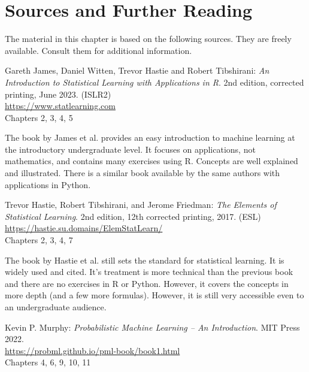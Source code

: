 %
%

\section*{Sources and Further Reading}

The material in this chapter is based on the following sources. They are freely available. Consult them for additional information.

\begin{tcolorbox}[colback=alert]
Gareth James, Daniel Witten, Trevor Hastie and Robert Tibshirani: \emph{An Introduction to Statistical Learning with Applications in R}. 2nd edition, corrected printing, June 2023. (ISLR2) \\

\url{https://www.statlearning.com} \\

Chapters 2, 3, 4, 5
\end{tcolorbox}

The book by James et al. provides an easy introduction to machine learning at the introductory undergraduate level. It focuses on applications, not mathematics, and contains many exercises using R. Concepts are well explained and illustrated. There is a similar book available by the same authors with applications in Python. 

\begin{tcolorbox}[colback=alert]
Trevor Hastie, Robert Tibshirani, and Jerome Friedman: \emph{The Elements of Statistical Learning}. 2nd edition, 12th corrected printing, 2017. (ESL) \\

\url{https://hastie.su.domains/ElemStatLearn/} \\

Chapters 2, 3, 4, 7
\end{tcolorbox}

The book by Hastie et al. still sets the standard for statistical learning. It is widely used and cited. It's treatment is more technical than the previous book and there are no exercises in R or Python. However, it covers the concepts in more depth (and a few more formulas). However, it is still very accessible even to an undergraduate audience.

\begin{tcolorbox}[colback=alert]
Kevin P. Murphy: \emph{Probabilistic Machine Learning -- An Introduction}. MIT Press 2022. \\

\url{https://probml.github.io/pml-book/book1.html} \\

Chapters 4, 6, 9, 10, 11
\end{tcolorbox}

